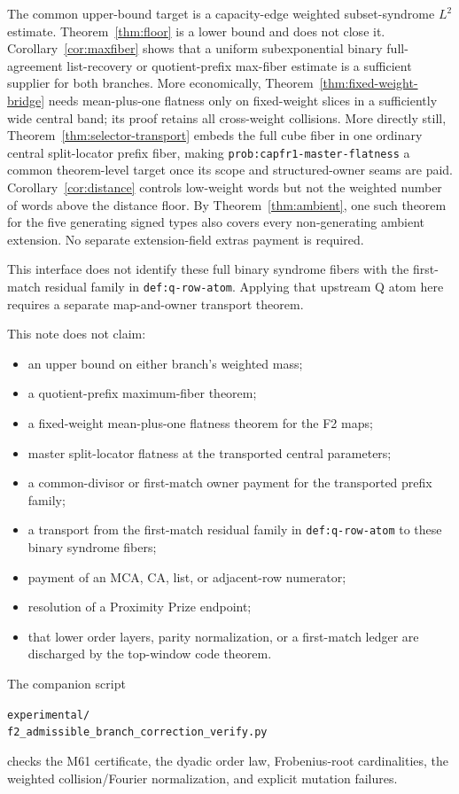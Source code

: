 \documentclass[11pt,a4paper]{amsart}
\theoremstyle{remark}
\begin{document}
The common upper-bound target is a capacity-edge weighted subset-syndrome
$L^2$ estimate.  Theorem~\ref{thm:floor} is a lower bound and does not close
it.  Corollary~\ref{cor:maxfiber} shows that a uniform subexponential binary
full-agreement list-recovery or quotient-prefix max-fiber estimate is a
sufficient supplier for both branches.  More economically,
Theorem~\ref{thm:fixed-weight-bridge} needs mean-plus-one flatness only on
fixed-weight slices in a sufficiently wide central band; its proof retains
all cross-weight collisions.  More directly still,
Theorem~\ref{thm:selector-transport} embeds the full cube fiber in one
ordinary central split-locator prefix fiber, making
\texttt{prob:capfr1-master-flatness} a common theorem-level target once its
scope and structured-owner seams are paid.  Corollary~\ref{cor:distance} controls
low-weight words but not the
weighted number of words above the distance floor.
By Theorem~\ref{thm:ambient}, one such theorem for the five generating
signed types also covers every non-generating ambient extension.  No separate
extension-field extras payment is required.

This interface does not identify these full binary syndrome fibers with the
first-match residual family in \texttt{def:q-row-atom}.  Applying that
upstream Q atom here requires a separate map-and-owner transport theorem.

This note does not claim:
\begin{itemize}
\item an upper bound on either branch's weighted mass;
\item a quotient-prefix maximum-fiber theorem;
\item a fixed-weight mean-plus-one flatness theorem for the F2 maps;
\item master split-locator flatness at the transported central parameters;
\item a common-divisor or first-match owner payment for the transported
      prefix family;
\item a transport from the first-match residual family in
      \texttt{def:q-row-atom} to these binary syndrome fibers;
\item payment of an MCA, CA, list, or adjacent-row numerator;
\item resolution of a Proximity Prize endpoint;
\item that lower order layers, parity normalization, or a first-match ledger
      are discharged by the top-window code theorem.
\end{itemize}

The companion script
\begin{center}
\small
\texttt{experimental/}\\
\texttt{f2\_admissible\_branch\_correction\_verify.py}
\end{center}
checks the M61 certificate, the dyadic order law, Frobenius-root cardinalities,
the weighted collision/Fourier normalization, and explicit mutation failures.
\end{document}
